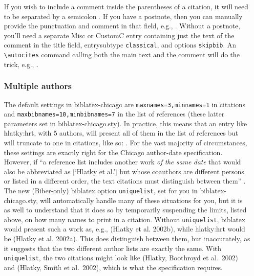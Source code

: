 \documentclass[a4paper,12pt]{report}
\newcommand{\cmd}[1]{\texttt{\textbackslash #1}}
\begin{document}
If you wish to include a comment inside the parentheses of a citation,
it will need to be separated by a semicolon
\autocite[16.111]{chicago:manual:15}.  If you have a
\textsf{postnote}, then you can manually provide the punctuation and
comment in that field, e.g., \autocite[4; the unrevised
trans.]{stendhal:parma}.  Without a \textsf{postnote}, you'll need a
separate Misc or CustomC entry containing just the text of the comment
in the \textsf{title} field, \textsf{entrysubtype} \texttt{classical},
and \textsf{options} \texttt{skipbib}.  An \cmd{autocites} command
calling both the main text and the comment will do the trick, e.g.,
\autocites{chicago:manual:15}{chicago:comment:15}.

\subsubsection*{Multiple authors}
\label{sec:multiple}

The default settings in \textsf{biblatex-chicago} are
\texttt{maxnames=3,minnames=1} in citations and
\texttt{max\-bibnames=10,minbibnames=7} in the list of references
(these latter parameters set in \textsf{biblatex-chicago.sty}).  In
practice, this means that an entry like hlatky:hrt, with 5 authors,
will present all of them in the list of references but will truncate
to one in citations, like so: \autocite{hlatky:hrt}.  For the vast
majority of circumstances, these settings are exactly right for the
Chicago author-date specification.  However, if \enquote{a reference
  list includes another work \emph{of the same date} that would also
  be abbreviated as [\enquote{Hlatky et al.}] but whose coauthors are
  different persons or listed in a different order, the text citations
  must distinguish between them} \autocite[16.118]{chicago:manual:15}.
The new (\textsf{Biber}-only) \textsf{biblatex} option
\texttt{uniquelist}, set for you in \textsf{biblatex-chicago.sty},
will automatically handle many of these situations for you, but it is
as well to understand that it does so by temporarily suspending the
limits, listed above, on how many names to print in a citation.
Without \texttt{uniquelist}, \textsf{biblatex} would present such a
work as, e.g., (Hlatky et al. 2002b), while hlatky:hrt would be
(Hlatky et al. 2002a).  This does distinguish between them, but
inaccurately, as it suggests that the two different author lists are
exactly the same.  With \texttt{uniquelist}, the two citations might
look like (Hlatky, Boothroyd et al.\ 2002) and (Hlatky, Smith et al.\
2002), which is what the specification requires.
\end{document}
